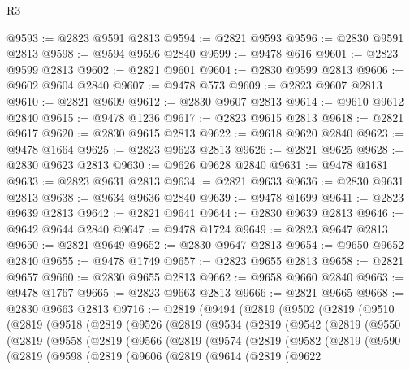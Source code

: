 \begin{lexlean}{R3}
\begin{coremodule}
@9593 := @2823 @9591 @2813
@9594 := @2821 @9593
@9596 := @2830 @9591 @2813
@9598 := @9594 @9596 @2840
@9599 := @9478 @616
@9601 := @2823 @9599 @2813
@9602 := @2821 @9601
@9604 := @2830 @9599 @2813
@9606 := @9602 @9604 @2840
@9607 := @9478 @573
@9609 := @2823 @9607 @2813
@9610 := @2821 @9609
@9612 := @2830 @9607 @2813
@9614 := @9610 @9612 @2840
@9615 := @9478 @1236
@9617 := @2823 @9615 @2813
@9618 := @2821 @9617
@9620 := @2830 @9615 @2813
@9622 := @9618 @9620 @2840
@9623 := @9478 @1664
@9625 := @2823 @9623 @2813
@9626 := @2821 @9625
@9628 := @2830 @9623 @2813
@9630 := @9626 @9628 @2840
@9631 := @9478 @1681
@9633 := @2823 @9631 @2813
@9634 := @2821 @9633
@9636 := @2830 @9631 @2813
@9638 := @9634 @9636 @2840
@9639 := @9478 @1699
@9641 := @2823 @9639 @2813
@9642 := @2821 @9641
@9644 := @2830 @9639 @2813
@9646 := @9642 @9644 @2840
@9647 := @9478 @1724
@9649 := @2823 @9647 @2813
@9650 := @2821 @9649
@9652 := @2830 @9647 @2813
@9654 := @9650 @9652 @2840
@9655 := @9478 @1749
@9657 := @2823 @9655 @2813
@9658 := @2821 @9657
@9660 := @2830 @9655 @2813
@9662 := @9658 @9660 @2840
@9663 := @9478 @1767
@9665 := @2823 @9663 @2813
@9666 := @2821 @9665
@9668 := @2830 @9663 @2813
@9716 := @2819
    (@9494
      (@2819
        (@9502
          (@2819
            (@9510
              (@2819
                (@9518
                  (@2819
                    (@9526
                      (@2819
                        (@9534
                          (@2819
                            (@9542
                              (@2819
                                (@9550
                                  (@2819
                                    (@9558
                                      (@2819
                                        (@9566
                                          (@2819
                                            (@9574
                                              (@2819
                                                (@9582
                                                  (@2819
                                                    (@9590
                                                      (@2819
                                                        (@9598
                                                          (@2819
                                                            (@9606
                                                              (@2819
                                                                (@9614
                                                                  (@2819
                                                                    (@9622

\end{coremodule}
\end{lexlean}
